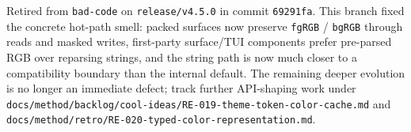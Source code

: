 Retired from \texttt{b\allowbreak{}a\allowbreak{}d\allowbreak{}-\allowbreak{}c\allowbreak{}o\allowbreak{}d\allowbreak{}e} on \texttt{r\allowbreak{}e\allowbreak{}l\allowbreak{}e\allowbreak{}a\allowbreak{}s\allowbreak{}e\allowbreak{}/\allowbreak{}v\allowbreak{}4\allowbreak{}.\allowbreak{}5\allowbreak{}.\allowbreak{}0} in commit \texttt{6\allowbreak{}9\allowbreak{}2\allowbreak{}9\allowbreak{}1\allowbreak{}f\allowbreak{}a}. This branch fixed the concrete hot-path smell: packed surfaces now preserve \texttt{f\allowbreak{}g\allowbreak{}R\allowbreak{}G\allowbreak{}B} / \texttt{b\allowbreak{}g\allowbreak{}R\allowbreak{}G\allowbreak{}B} through reads and masked writes, first-party surface/TUI components prefer pre-parsed RGB over reparsing strings, and the string path is now much closer to a compatibility boundary than the internal default. The remaining deeper evolution is no longer an immediate defect; track further API-shaping work under \texttt{d\allowbreak{}o\allowbreak{}c\allowbreak{}s\allowbreak{}/\allowbreak{}m\allowbreak{}e\allowbreak{}t\allowbreak{}h\allowbreak{}o\allowbreak{}d\allowbreak{}/\allowbreak{}b\allowbreak{}a\allowbreak{}c\allowbreak{}k\allowbreak{}l\allowbreak{}o\allowbreak{}g\allowbreak{}/\allowbreak{}c\allowbreak{}o\allowbreak{}o\allowbreak{}l\allowbreak{}-\allowbreak{}i\allowbreak{}d\allowbreak{}e\allowbreak{}a\allowbreak{}s\allowbreak{}/\allowbreak{}R\allowbreak{}E\allowbreak{}-\allowbreak{}0\allowbreak{}1\allowbreak{}9\allowbreak{}-\allowbreak{}t\allowbreak{}h\allowbreak{}e\allowbreak{}m\allowbreak{}e\allowbreak{}-\allowbreak{}t\allowbreak{}o\allowbreak{}k\allowbreak{}e\allowbreak{}n\allowbreak{}-\allowbreak{}c\allowbreak{}o\allowbreak{}l\allowbreak{}o\allowbreak{}r\allowbreak{}-\allowbreak{}c\allowbreak{}a\allowbreak{}c\allowbreak{}h\allowbreak{}e\allowbreak{}.\allowbreak{}m\allowbreak{}d} and \texttt{d\allowbreak{}o\allowbreak{}c\allowbreak{}s\allowbreak{}/\allowbreak{}m\allowbreak{}e\allowbreak{}t\allowbreak{}h\allowbreak{}o\allowbreak{}d\allowbreak{}/\allowbreak{}r\allowbreak{}e\allowbreak{}t\allowbreak{}r\allowbreak{}o\allowbreak{}/\allowbreak{}R\allowbreak{}E\allowbreak{}-\allowbreak{}0\allowbreak{}2\allowbreak{}0\allowbreak{}-\allowbreak{}t\allowbreak{}y\allowbreak{}p\allowbreak{}e\allowbreak{}d\allowbreak{}-\allowbreak{}c\allowbreak{}o\allowbreak{}l\allowbreak{}o\allowbreak{}r\allowbreak{}-\allowbreak{}r\allowbreak{}e\allowbreak{}p\allowbreak{}r\allowbreak{}e\allowbreak{}s\allowbreak{}e\allowbreak{}n\allowbreak{}t\allowbreak{}a\allowbreak{}t\allowbreak{}i\allowbreak{}o\allowbreak{}n\allowbreak{}.\allowbreak{}m\allowbreak{}d}.

